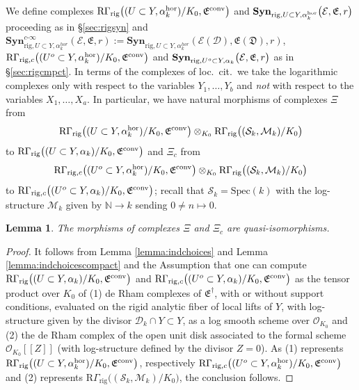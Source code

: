 \documentclass[asterisque,english]{smfart}
\newtheorem{lemma}[theo]{Lemma}
\begin{document}
We define complexes $\mathrm{R}\Gamma_{\mathrm{rig}}\bigl((U\subset Y,\alpha_k^{\rm hor})/K_0,\mathfrak{E}^{\rm conv}\bigr)$ and $\mathbf{Syn}_{{\rm rig},U\subset Y, \alpha_k^{\rm hor}}\bigl(\mathcal{E},\mathfrak{E},r\bigr)$ proceeding as in \S \ref{sec:rigsyn} and $\mathbf{Syn}_{\mathrm{rig},U\subset Y,\alpha _{k}^{hor}}^{c\text{-}\infty
}\left( \mathcal{E},\mathfrak{E},r\right) :=\mathbf{Syn}_{\mathrm{rig}%
,U\subset Y,\alpha _{k}^{hor}}\left( \mathcal{E}\left( \mathcal{D}\right) ,%
\mathfrak{E}\left( \mathfrak{D}\right) ,r\right) $, $\mathrm{R}\Gamma_{\mathrm{rig},c}\bigl((U^o\subset Y,\alpha_k^{\rm hor})/K_0,\mathfrak{E}^{\rm conv}\bigr)$ and
$\mathbf{Syn}_{{\rm rig},U^o\subset Y, \alpha_k}\bigl(\mathcal{E},\mathfrak{E},r\bigr)$ as in \S \ref{sec:rigcmpct}. In terms of the complexes of loc.~cit.~we take the logarithmic complexes only with respect to the variables $Y_1,\ldots,Y_b$ and {\em not} with respect to the variables $X_1,\ldots,X_a$.
In particular, we have natural morphisms of complexes $\Xi$ from $$\mathrm{R}\Gamma_{\mathrm{rig}}\bigl((U\subset Y,\alpha_k^{\rm hor})/K_0,\mathfrak{E}^{\rm conv}\bigr)\otimes_{K_0} \mathrm{R}\Gamma_{\mathrm{rig}}\bigl((\mathcal{S}_k,\mathcal{M}_k)/K_0\bigr)$$to $\mathrm{R}\Gamma_{\mathrm{rig}}\bigl((U\subset Y,\alpha_k)/K_0,\mathfrak{E}^{\rm conv}\bigr)$ and $\Xi_c$ from
$$\mathrm{R}\Gamma_{\mathrm{rig},c}\bigl((U^o\subset Y,\alpha_k^{\rm hor})/K_0,\mathfrak{E}^{\rm conv}\bigr)\otimes_{K_0} \mathrm{R}\Gamma_{\mathrm{rig}}\bigl((\mathcal{S}_k,\mathcal{M}_k)/K_0\bigr)$$ to $\mathrm{R}\Gamma_{\mathrm{rig},c}\bigl((U^o \subset Y,\alpha_k)/K_0,\mathfrak{E}^{\rm conv}\bigr)$; recall that $\mathcal{S}_k=\mathrm{Spec}(k)$ with the log-structure $\mathcal{M}_k$ given by $\mathbb {N }\to k$ sending $0\neq n\mapsto 0$. 

\begin{lemma} The morphisms of complexes $\Xi$ and $\Xi_c$ are quasi-isomorphisms.
\end{lemma}
\begin{proof} It follows from Lemma \ref{lemma:indchoices} and  Lemma \ref{lemma:indchoicescompact}
and the Assumption that one can compute $\mathrm{R}\Gamma_{\mathrm{rig}}\bigl((U\subset Y,\alpha_k)/K_0,\mathfrak{E}^{\rm conv}\bigr)$ and $\mathrm{R}\Gamma_{\mathrm{rig},c}\bigl((U^o \subset Y,\alpha_k)/K_0,\mathfrak{E}^{\rm conv}\bigr)$ as the tensor product over $K_0$ of (1) de Rham complexes of $\mathfrak{E}^\dagger$, with or without support conditions, evaluated on the rigid analytic fiber of local lifts of $Y$, with log-structure given by the divisor $\mathcal{D}_k\cap Y\subset Y$, as a log smooth scheme over $\mathcal{O}_{K_0}$ and (2)  the de Rham complex of the open unit disk associated to the formal scheme  $\mathcal{O}_{K_0}[\![Z]\!]$ (with log-structure defined by the divisor $Z=0$).  As (1) represents $\mathrm{R}\Gamma_{\mathrm{rig}}\bigl((U\subset Y,\alpha_k^{\rm hor})/K_0,\mathfrak{E}^{\rm conv}\bigr)$, respectively $\mathrm{R}\Gamma_{\mathrm{rig},c}\bigl((U^o\subset Y,\alpha_k^{\rm hor})/K_0,\mathfrak{E}^{\rm conv}\bigr)$ and (2) represents  $\mathrm{R}\Gamma_{\mathrm{rig}}\bigl((\mathcal{S}_k,\mathcal{M}_k)/K_0\bigr)$, the conclusion follows.
\end{proof}
\end{document}
